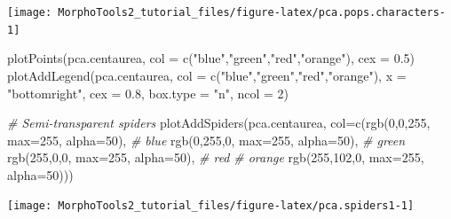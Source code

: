 \documentclass[
  11pt,
  a4paper]{article}
\newenvironment{Shaded}{\begin{snugshade}}{\end{snugshade}}
\newcommand{\AttributeTok}[1]{\textcolor[rgb]{0.77,0.63,0.00}{#1}}
\newcommand{\CommentTok}[1]{\textcolor[rgb]{0.56,0.35,0.01}{\textit{#1}}}
\newcommand{\DecValTok}[1]{\textcolor[rgb]{0.00,0.00,0.81}{#1}}
\newcommand{\FloatTok}[1]{\textcolor[rgb]{0.00,0.00,0.81}{#1}}
\newcommand{\FunctionTok}[1]{\textcolor[rgb]{0.00,0.00,0.00}{#1}}
\newcommand{\NormalTok}[1]{#1}
\newcommand{\StringTok}[1]{\textcolor[rgb]{0.31,0.60,0.02}{#1}}
\begin{document}
\begin{center}\texttt{[image: MorphoTools2\_tutorial\_files/figure-latex/pca.pops.characters-1]} \end{center}

\begin{Shaded}
\begin{Highlighting}[]
\FunctionTok{plotPoints}\NormalTok{(pca.centaurea, }\AttributeTok{col =} \FunctionTok{c}\NormalTok{(}\StringTok{"blue"}\NormalTok{,}\StringTok{"green"}\NormalTok{,}\StringTok{"red"}\NormalTok{,}\StringTok{"orange"}\NormalTok{), }\AttributeTok{cex =} \FloatTok{0.5}\NormalTok{)}
\FunctionTok{plotAddLegend}\NormalTok{(pca.centaurea, }\AttributeTok{col =} \FunctionTok{c}\NormalTok{(}\StringTok{"blue"}\NormalTok{,}\StringTok{"green"}\NormalTok{,}\StringTok{"red"}\NormalTok{,}\StringTok{"orange"}\NormalTok{), }
               \AttributeTok{x =} \StringTok{"bottomright"}\NormalTok{, }\AttributeTok{cex =} \FloatTok{0.8}\NormalTok{, }\AttributeTok{box.type =} \StringTok{"n"}\NormalTok{, }\AttributeTok{ncol =} \DecValTok{2}\NormalTok{)}

\CommentTok{\# Semi{-}transparent spiders}
\FunctionTok{plotAddSpiders}\NormalTok{(pca.centaurea, }\AttributeTok{col=}\FunctionTok{c}\NormalTok{(}\FunctionTok{rgb}\NormalTok{(}\DecValTok{0}\NormalTok{,}\DecValTok{0}\NormalTok{,}\DecValTok{255}\NormalTok{, }\AttributeTok{max=}\DecValTok{255}\NormalTok{, }\AttributeTok{alpha=}\DecValTok{50}\NormalTok{), }\CommentTok{\# blue}
                                    \FunctionTok{rgb}\NormalTok{(}\DecValTok{0}\NormalTok{,}\DecValTok{255}\NormalTok{,}\DecValTok{0}\NormalTok{, }\AttributeTok{max=}\DecValTok{255}\NormalTok{, }\AttributeTok{alpha=}\DecValTok{50}\NormalTok{), }\CommentTok{\# green}
                                    \FunctionTok{rgb}\NormalTok{(}\DecValTok{255}\NormalTok{,}\DecValTok{0}\NormalTok{,}\DecValTok{0}\NormalTok{, }\AttributeTok{max=}\DecValTok{255}\NormalTok{, }\AttributeTok{alpha=}\DecValTok{50}\NormalTok{), }\CommentTok{\# red}
                                    \CommentTok{\# orange}
                                    \FunctionTok{rgb}\NormalTok{(}\DecValTok{255}\NormalTok{,}\DecValTok{102}\NormalTok{,}\DecValTok{0}\NormalTok{, }\AttributeTok{max=}\DecValTok{255}\NormalTok{, }\AttributeTok{alpha=}\DecValTok{50}\NormalTok{)))}
\end{Highlighting}
\end{Shaded}

\begin{center}\texttt{[image: MorphoTools2\_tutorial\_files/figure-latex/pca.spiders1-1]} \end{center}
\end{document}

